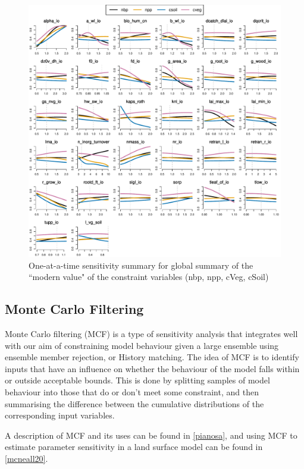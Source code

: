 \documentclass[gmd, manuscript]{copernicus}
\begin{document}
\begin{figure}[t]
\includegraphics[width=12cm]{./graphics/Y_oaat_const_level1a_scaled_norm}
\caption{One-at-a-time sensitivity summary for global summary of the ``modern value" of the constraint variables (nbp, npp, cVeg, cSoil)}
\label{fig:Y_oaat_const_level1a_scaled_norm}
\end{figure}


\subsection{Monte Carlo Filtering}

Monte Carlo filtering (MCF) is a type of sensitivity analysis that integrates well with our aim of constraining model behaviour given a large ensemble using ensemble member rejection, or History matching. The idea of MCF is to identify inputs that have an influence on whether the behaviour of the model falls within or outside acceptable bounds. This is done by splitting samples of model behaviour into those that do or don't meet some constraint, and then summarising the difference between the cumulative distributions of the corresponding input variables.

A description of MCF and its uses can be found in \ref{pianosa}, and using MCF to estimate parameter sensitivity in a land surface model can be found in \ref{mcneall20}.
\end{document}
